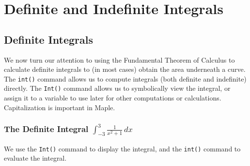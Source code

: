 \chapter{Definite and Indefinite Integrals}
\label{chp:definite_and_indefinite_Integrals}	

\section{Definite Integrals}

We now turn our attention to using the Fundamental Theorem of Calculus to calculate definite integrals to (in most cases) obtain the area underneath a curve.\\

The \texttt{int()} command allows us to compute integrals (both definite and indefinite) directly. The \texttt{Int()} command allows us to symbolically view the integral, or assign it to a variable to use later for other computations or calculations. Capitalization is important in Maple.

\subsection{The Definite Integral $\displaystyle\int_{-3}^{3}\frac{1}{x^2+1}\, dx$}

\begin{maplegroup}
\begin{mapleinput}
\end{mapleinput}
\mapleresult
\begin{maplelatex}
\end{maplelatex}
\end{maplegroup}
\begin{maplegroup}
\begin{mapleinput}
\end{mapleinput}
\mapleresult
{}
\end{maplegroup}


We use the \texttt{Int()} command to display the integral, and the \texttt{int()} command to evaluate the integral.


